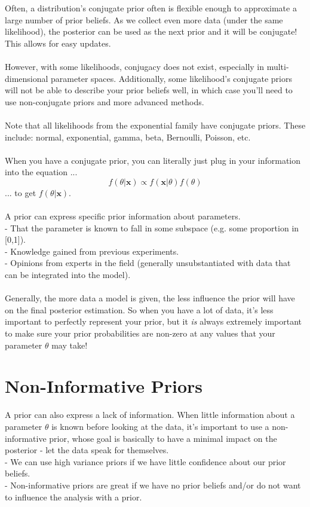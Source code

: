 \documentclass[12pt]{book}
\begin{document}
Often, a distribution's conjugate prior often is flexible enough to approximate a large number of prior beliefs. As we collect even more data (under the same likelihood), the posterior can be used as the next prior and it will be conjugate! This allows for easy updates.
\\\\
However, with some likelihoods, conjugacy does not exist,
especially in multi-dimensional parameter spaces. Additionally, some likelihood's conjugate priors will not be able to describe your prior beliefs well, in which case you'll need to use non-conjugate priors and more advanced methods.
\\\\
Note that all likelihoods from the exponential family have conjugate priors. These include: normal, exponential, gamma, beta, Bernoulli, Poisson, etc.
\\\\
When you have a conjugate prior, you can literally just plug in your information into the equation ...
\begin{equation}
f(\theta|\textbf{x}) \propto f(\textbf{x}|\theta)f(\theta)
\end{equation}
... to get $f(\theta|\textbf{x})$.
\\\\
A prior can express specific prior information about parameters.\\
- That the parameter is known to fall in some subspace (e.g. some proportion in [0,1]).\\
- Knowledge gained from previous experiments.\\
- Opinions from experts in the field (generally unsubstantiated with data that can be integrated into the model). 
\\\\
Generally, the more data a model is given, the less influence the prior will have on the final posterior estimation. So when you have a lot of data, it's less important to perfectly represent your prior, but it \textit{is} always extremely important to make sure your prior probabilities are non-zero at any values that your parameter $\theta$ may take!




\section{Non-Informative Priors}
A prior can also express a lack of information. When little information about a parameter $\theta$ is known before looking at the data, it's important to use a non-informative prior, whose goal is basically to have a minimal impact on the posterior - let the data speak for themselves.
\\ 
- We can use high variance priors if we have little confidence about our prior beliefs. \\
- Non-informative priors are great if we have no prior beliefs and/or do not want to influence the analysis with a prior.
\end{document}
